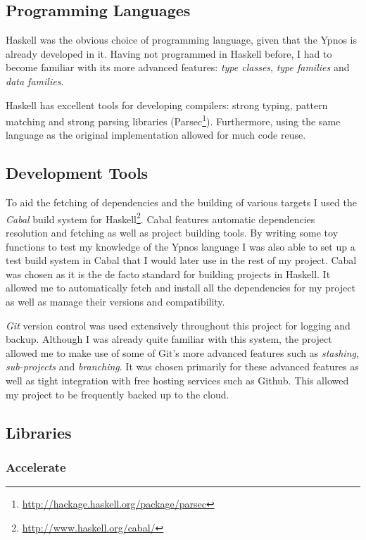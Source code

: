 \documentclass[12pt,a4paper,twoside]{scrbook}
\begin{document}
\subsection{Programming Languages}

Haskell was the obvious choice of programming language, given that the Ypnos is
already developed in it. Having not programmed in Haskell before, I had to
become familiar with its more advanced features: \emph{type classes}, \emph{type
  families} and \emph{data families}.

Haskell has excellent tools for developing compilers: strong typing, pattern
matching and strong parsing libraries
(Parsec\footnote{\url{http://hackage.haskell.org/package/parsec}}).
Furthermore, using the same language as the original implementation allowed for
much code reuse.

\subsection{Development Tools}

To aid the fetching of dependencies and the building of various targets I used
the \emph{Cabal} build system for
Haskell\footnote{\url{http://www.haskell.org/cabal/}}. Cabal features automatic
dependencies resolution and fetching as well as project building tools. By
writing some toy functions to test my knowledge of the Ypnos language I was also
able to set up a test build system in Cabal that I would later use in the rest
of my project. Cabal was chosen as it is the de facto standard for building
projects in Haskell. It allowed me to automatically fetch and install all the
dependencies for my project as well as manage their versions and compatibility.

\emph{Git} version control was used extensively throughout this project for
logging and backup. Although I was already quite familiar with this system, the
project allowed me to make use of some of Git's more advanced features such as
\emph{stashing}, \emph{sub-projects} and \emph{branching}. It was chosen
primarily for these advanced features as well as tight integration with free
hosting services such as Github. This allowed my project to be frequently backed
up to the cloud.

\subsection{Libraries}

\subsubsection{Accelerate}
\end{document}
